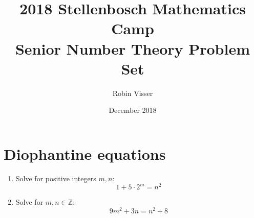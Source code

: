 \documentclass[a4paper, 12pt]{article}
\title{2018 Stellenbosch Mathematics Camp \\ Senior Number Theory Problem Set}
\author{Robin Visser}
\date{December 2018}
\newcommand{\solution}[1]{%
   \emph{Solution}: 
    #1            
}
\renewcommand{\solution}[1]{}
\begin{document}
\maketitle




\section{Diophantine equations}

\begin{enumerate}


\item Solve for positive integers $m, n$:
\begin{equation*}
    1 + 5 \cdot 2^m = n^2
\end{equation*}

\solution{ We have $(n-1)(n+1) = 5 \cdot 2^m$. Note that $n$ is odd, which implies both $n-1$ and $n+1$ are even. Furthermore, gcd($n-1, n+1$) = 2. Therefore, we have either $v_2(n-1) = 1$ or $v_2(n+1) = 1$. Noting the cases for 5, this yields the following possibilities:
\begin{align*}
    n - 1 &= 2 \quad \textrm{or} \quad n - 1 = 10 \\
    \textrm{or} \quad  n + 1 &= 2 \quad \textrm{or} \quad n + 1 = 10 
\end{align*}
Noting all cases, one obtains that only $n=9$ yields a valid solution where $m = 4$. Thus the only solution is $(n, m) = (9, 4)$. \qed

}

\item Solve for $m, n \in \mathbb{Z}$:
\begin{equation*}
    9m^2+3n=n^2+8
\end{equation*}

\solution{ We consider the equation as a quadratic in $n$
\begin{equation*}
    n^2-3n+8-9m^2=0
\end{equation*}
Solving for the discriminant $\Delta$ yields
\begin{equation*}
    \Delta = 9 - 4(8 - 9m^2) = 36m^2 - 23
\end{equation*}
For $n$ to be an integer, we require $\Delta$ to be a perfect square. Thus $36m^2 - 23 = l^2$ for some $l \geq 0$. Factoring, we obtain $(6m+l)(6m-l)=23$. As 23 is prime, this yields
\begin{equation*}
    6m \mp l = \pm 1 \quad \textrm{and} \quad 6m \pm l = \pm 23
\end{equation*}
Solving this system yields $m - 2$ and $l = 11$, or $m = -2$ and $l = 11$. This therefore gives the following four solutions: $(m, n) \in \{(2, -4), (2, 7), (-2, -4), (-2, 7) \}$. \qed
}



\end{enumerate}
\end{document}

